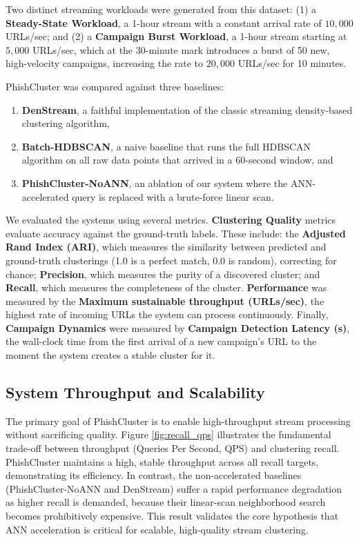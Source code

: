 \documentclass[journal,article,submit,pdftex,moreauthors]{Definitions/mdpi}
\begin{document}
Two distinct streaming workloads were generated from this dataset: (1) a \textbf{Steady-State Workload}, a 1-hour stream with a constant arrival rate of $10,000$ URLs/sec; and (2) a \textbf{Campaign Burst Workload}, a 1-hour stream starting at $5,000$ URLs/sec, which at the 30-minute mark introduces a burst of 50 new, high-velocity campaigns, increasing the rate to $20,000$ URLs/sec for 10 minutes.

PhishCluster was compared against three baselines: 
\begin{enumerate}
\item \textbf{DenStream}, a faithful implementation of the classic streaming density-based clustering algorithm,
\item \textbf{Batch-HDBSCAN}, a naive baseline that runs the full HDBSCAN algorithm on all raw data points that arrived in a 60-second window, and 
\item \textbf{PhishCluster-NoANN}, an ablation of our system where the ANN-accelerated query is replaced with a brute-force linear scan.
\end{enumerate}

We evaluated the systems using several metrics. \textbf{Clustering Quality} metrics evaluate accuracy against the ground-truth labels. These include: the \textbf{Adjusted Rand Index (ARI)}, which measures the similarity between predicted and ground-truth clusterings (1.0 is a perfect match, 0.0 is random), correcting for chance; \textbf{Precision}, which measures the purity of a discovered cluster; and \textbf{Recall}, which measures the completeness of the cluster. \textbf{Performance} was measured by the \textbf{Maximum sustainable throughput (URLs/sec)}, the highest rate of incoming URLs the system can process continuously. Finally, \textbf{Campaign Dynamics} were measured by \textbf{Campaign Detection Latency (s)}, the wall-clock time from the first arrival of a new campaign's URL to the moment the system creates a stable cluster for it.


\subsection{System Throughput and Scalability}

The primary goal of PhishCluster is to enable high-throughput stream processing without sacrificing quality. Figure \ref{fig:recall_qps} illustrates the fundamental trade-off between throughput (Queries Per Second, QPS) and clustering recall. PhishCluster maintains a high, stable throughput across all recall targets, demonstrating its efficiency. In contrast, the non-accelerated baselines (PhishCluster-NoANN and DenStream) suffer a rapid performance degradation as higher recall is demanded, because their linear-scan neighborhood search becomes prohibitively expensive. This result validates the core hypothesis that ANN acceleration is critical for scalable, high-quality stream clustering.
\end{document}
